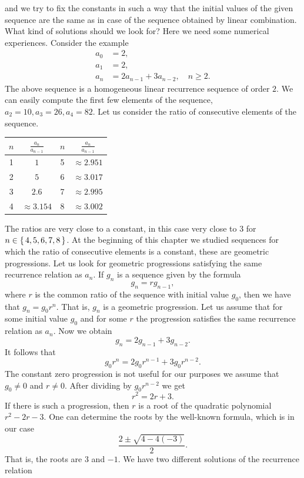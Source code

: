 and we try to fix the constants in such a way that the initial values of the given sequence
are the same as in case of the sequence obtained by linear combination. What kind of solutions
should we look for? Here we need some numerical experiences. Consider the example
\begin{align*}
a_0&=2,\\
a_1&=2,\\
a_n&=2a_{n-1}+3a_{n-2},\quad n\geq 2.
\end{align*}
The above sequence is a homogeneous linear recurrence sequence of order $2$.
We can easily compute the first few elements of the sequence, $a_2=10, a_3=26, a_4=82$.
Let us consider the ratio of consecutive elements of the sequence.
\begin{center}
\begin{tabular}{|c|c||c|c|}
\hline
$n$ & $\frac{a_n}{a_{n-1}}$ & $n$ & $\frac{a_n}{a_{n-1}}$\\
\hline
1 & $1$ & 5 & $\approx 2.951$\\
\hline
2 & $5$ & 6 & $\approx 3.017$\\
\hline
3 & $2.6$ & 7 & $\approx 2.995$\\
\hline
4 & $\approx 3.154$ & 8 & $\approx 3.002$\\
\hline
\end{tabular}
\end{center}
The ratios are very close to a constant, in this case very close to 3 for $n\in\left\{\,4,5,6,7,8\,\right\}$.
At the beginning of this chapter we studied sequences for which the ratio of consecutive elements
is a constant, these are geometric progressions. Let us look for geometric progressions satisfying
the same recurrence relation as $a_n$. If $g_n$ is a sequence given by
the formula
$$
g_n=rg_{n-1},
$$
where $r$ is the common ratio of the sequence with initial value $g_0$, then we have that 
$g_n=g_0r^n$. That is, $g_n$ is a geometric progression. Let us assume that for some initial
value $g_0$ and for some $r$ the progression satisfies the same recurrence relation as $a_n$.
Now we obtain
$$
g_n=2g_{n-1}+3g_{n-2}.
$$
It follows that
$$
g_0r^n=2g_0r^{n-1}+3g_0r^{n-2}.
$$
The constant zero progression is not useful for our purposes we assume that $g_0\neq 0$ and $r\neq 0$.
After dividing by $g_0r^{n-2}$ we get
$$
r^2=2r+3.
$$
If there is such a progression, then $r$ is a root of the quadratic polynomial $r^2-2r-3$.
One can determine the roots by the well-known formula, which is in our case
$$
\frac{2\pm\sqrt{4-4(-3)}}{2}.
$$
That is, the roots are $3$ and $-1$. We have two different solutions of the recurrence relation
